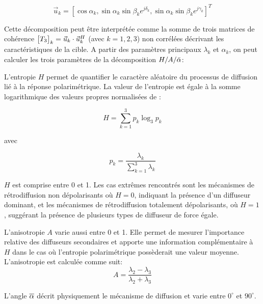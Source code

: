\begin{equation}
    \Vec{u}_k=[\cos{\alpha_k}, 
    \sin{\alpha_k} \sin{\beta_k} e^{j\delta_k}, 
    \sin{\alpha_k} \sin{\beta_k} e^{j\gamma_k} ]^T 
\end{equation}

\vspace{10pt}

Cette décomposition peut être interprétée comme la somme de trois matrices de cohérence $\begin{bmatrix} T_3 \end{bmatrix}_k = \Vec{u}_k \cdot  \Vec{u}_k^H$ (avec $k=1,2,3$)  non corrélées décrivant les caractéristiques de la cible.
A partir des paramètres principaux $\lambda_k$ et $\alpha_k$, on peut calculer les trois paramètres de la décomposition $H/A/\Bar{\alpha}$:

L’entropie $H$ permet de quantifier le caractère aléatoire du processus de diffusion lié à la réponse polarimétrique. La valeur de l'entropie est égale à la somme logarithmique des valeurs propres normalisées de \matcoh:

\begin{equation}  
    H = \sum_{k=1}^{3}p_k \log_3 p_k
\end{equation}

avec 

\begin{equation}  
    p_k = \frac{\lambda_k}{\sum_{k=1}^{3}\lambda_k}
\end{equation}

\vspace{10pt}

$H$ est comprise entre 0 et 1. Les cas extrêmes rencontrés sont les mécanismes de rétrodiffusion non dépolarisants où $H = 0$, indiquant la présence d'un diffuseur dominant, et les mécanismes de rétrodiffusion totalement dépolarisants, où $H = 1$, suggérant la présence de plusieurs types de diffuseur de force égale.

L’anisotropie $A$ varie aussi entre 0 et 1. Elle permet de mesurer l'importance relative des diffuseurs secondaires et apporte une information complémentaire à $H$ dans le cas où l’entropie polarimétrique possèderait une valeur moyenne.  L'anisotropie est calculée comme suit:
\begin{equation}  
    A = \frac{\lambda_2 -\lambda_3 }{\lambda_2 +\lambda_3}
\end{equation}

\vspace{10pt}

L’angle  $\overline{\alpha}$ décrit physiquement le mécanisme de diffusion et varie entre $0^{\circ}$ et $90^{\circ}$.

